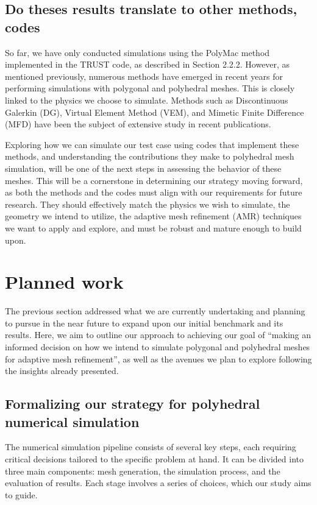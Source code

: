 \documentclass{article}
\begin{document}
\subsection{Do theses results translate to other methods, codes}
So far, we have only conducted simulations using the PolyMac method implemented in the TRUST code, as described in Section 2.2.2. However, as mentioned previously, numerous methods have emerged in recent years for performing simulations with polygonal and polyhedral meshes. This is closely linked to the physics we choose to simulate. Methods such as Discontinuous Galerkin (DG), Virtual Element Method (VEM), and Mimetic Finite Difference (MFD) have been the subject of extensive study in recent publications.

Exploring how we can simulate our test case using codes that implement these methods, and understanding the contributions they make to polyhedral mesh simulation, will be one of the next steps in assessing the behavior of these meshes. This will be a cornerstone in determining our strategy moving forward, as both the methods and the codes must align with our requirements for future research. They should effectively match the physics we wish to simulate, the geometry we intend to utilize, the adaptive mesh refinement (AMR) techniques we want to apply and explore, and must be robust and mature enough to build upon.

\section{Planned work}
The previous section addressed what we are currently undertaking and planning to pursue in the near future to expand upon our initial benchmark and its results. Here, we aim to outline our approach to achieving our goal of ``making an informed decision on how we intend to simulate polygonal and polyhedral meshes for adaptive mesh refinement'', as well as the avenues we plan to explore following the insights already presented.

\subsection{Formalizing our strategy for polyhedral numerical simulation}
The numerical simulation pipeline consists of several key steps, each requiring critical decisions tailored to the specific problem at hand. It can be divided into three main components: mesh generation, the simulation process, and the evaluation of results. Each stage involves a series of choices, which our study aims to guide.
\end{document}
